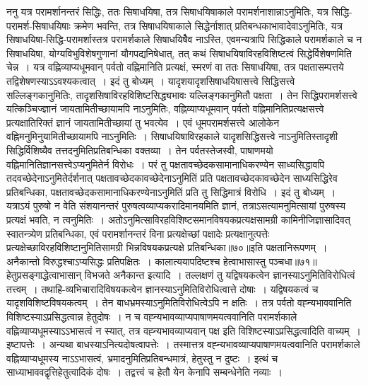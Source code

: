 ननु यत्र परामर्शानन्तरं सिद्धिः, ततः सिषाधयिषा, तत्र सिषाधयिषाकाले परामर्शनाशान्नाऽनुमितिः, यत्र सिद्धि-परामर्श-सिषाधयिषाः क्रमेण भवन्ति, तत्र
सिषाधयिषाकाले सिद्धेर्नाशात् प्रतिबन्धकाभावादेवाऽनुमितिः, यत्र सिषाधयिषा-सिद्धि-परामर्शास्तत्र परामर्शकाले सिषाधयिषैेव नाऽस्ति, एवमन्यत्रापि सिद्धिकाले परामर्शकाले
च न सिषाधयिषा, योग्यविभुविशेषगुणानां यौगपद्यनिषेधात्, तत् कथं सिषाधयिषाविरहविशिष्टत्वं सिद्धेर्विशेषणमिति चेन्न~।
यत्र वह्निव्याप्यधूमवान् पर्वतो वह्निमानिति प्रत्यक्षं, स्मरणं वा ततः सिषाधयिषा, तत्र पक्षतासम्पत्तये तद्विशेषणस्याऽऽवश्यकत्वात्~।
इदं तु बोध्यम्~। यादृशयादृशसिषाधयिषासत्त्वे सिद्धिसत्त्वे सल्लिङ्गकानुमितिः, तादृशसिषाविरहविशिष्टसिद्ध्यभावः यल्लिङ्गकानुमितौ पक्षता~। तेन सिद्धिपरामर्शसत्त्वे
यत्किञ्चिज्ज्ञानं जायतामितीच्छायामपि नाऽनुमितिः, वह्निव्याप्यधूमवान् पर्वतो वह्निमानितिप्रत्यक्षसत्त्वे प्रत्यक्षातिरिक्तं ज्ञानं जायतामितीच्छायां तु भवत्येव~। एवं
धूमपरामर्शसत्त्वे आलोकेन वह्निमनुमिनुयामितीच्छायामपि नाऽनुमितिः~।
सिषाधयिषाविरहकाले यादृशसिद्धिसत्त्वे नाऽनुमितिस्तादृशी सिद्धिर्विशिष्यैव तत्तदनुमितिप्रतिबन्धिका वक्तव्या~। तेन पर्वतस्तेजस्वी, पाषाणमयो
वह्निमानितिज्ञानसत्त्वेऽप्यनुमितेर्न विरोधः~। परं तु पक्षतावच्छेदकसामानाधिकरण्येन साध्यसिद्धावपि तदवच्छेदेनाऽनुमितेर्दर्शनात् पक्षतावच्छेदकावच्छेदेनाऽनुमितिं प्रति
पक्षतावच्छेदकावच्छेदेन साध्यसिद्धिरेव प्रतिबन्धिका, पक्षतावच्छेदकसामानाधिकरण्येनाऽनुमितिं प्रति तु सिद्धिमात्रं विरोधि~।
इदं तु बोध्यम्~। यत्राऽयं पुरुषो न वेति संशयानन्तरं पुरुषत्वव्याप्यकरादिमानयमिति ज्ञानं, तत्राऽसत्यामनुमित्सायां पुरुषस्य प्रत्यक्षं भवति, न त्वनुमितिः~।
अतोऽनुमित्साविरहविशिष्टसमानविषयकप्रत्यक्षसामग्री कामिनीजिज्ञासादिवत् स्वातन्त्र्येण प्रतिबन्धिका, एवं परामर्शानन्तरं विना प्रत्यक्षेच्छां पक्षादेः प्रत्यक्षानुत्पत्तेः
प्रत्यक्षेच्छाविरहविशिष्टानुमितिसामग्री भिन्नविषयकप्रत्यक्षे प्रतिबन्धिका॥७०॥इति पक्षतानिरूपणम्~।
अनैकान्तो विरुद्धश्चाऽप्यसिद्धः प्रतिपक्षितः~।
कालात्ययापदिष्टश्च हेत्वाभासास्तु पञ्चधा॥७१॥
हेतुप्रसङ्गाद्धेत्वाभासान् विभजते अनैकान्त इत्यादि~। तल्लक्षणं तु यद्विषयकत्वेन ज्ञानस्याऽनुमितिविरोधित्वं तत्त्वम्~। तथाहि-व्यभिचारादिविषयकत्वेन
ज्ञानस्याऽनुमितिविरोधित्वात्ते दोषाः~।
यद्विषयकत्वं च यादृशविशिष्टविषयकत्वम्~। तेन बाधभ्रमस्याऽनुमितिविरोधित्वेऽपि न क्षतिः~। तत्र पर्वतो वह्न्यभाववानिति विशिष्टस्याऽप्रसिद्धत्वान्न हेतुदोषः~।
न च वह्न्यभावव्याप्यपाषाणमयत्ववानिति परामर्शकाले वह्निव्याप्यधूमस्याऽऽभासत्वं न स्यात्, तत्र वह्न्यभावव्याप्यवान् पक्ष इति विशिष्टस्याऽप्रसिद्धत्वादिति
वाच्यम्~। इष्टापत्तेः~। अन्यथा बाधस्याऽनित्यदोषत्वापत्तेः~। तस्मात्तत्र वह्न्यभावव्याप्यपाषाणमयत्ववानिति परामर्शकाले वह्निव्याप्यधूमस्य नाऽऽभासत्वं, भ्रमादनुमितिप्रतिबन्धमात्रं,
हेतुस्तु न दुष्टः~। इत्थं च साध्याभाववद्वृत्तिहेतुत्वादिकं दोषः~। तद्वत्त्वं च हेतौ येन केनापि सम्बन्धेनेति नव्याः~।
